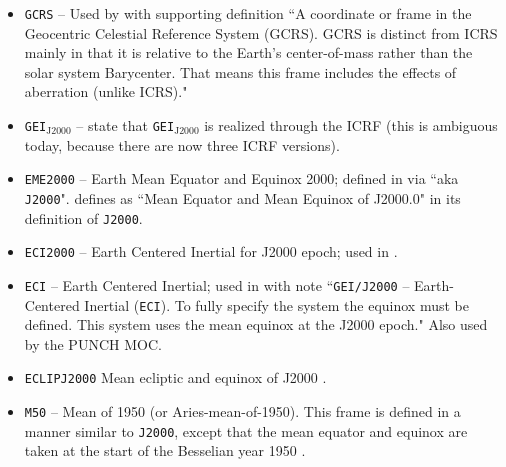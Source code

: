 \documentclass[draft]{agujournal2019}
\begin{document}
\begin{itemize}
    \item \texttt{GCRS} --  Used by  with supporting definition ``A coordinate or frame in the Geocentric Celestial Reference System (GCRS). GCRS is distinct from ICRS mainly in that it is relative to the Earth’s center-of-mass rather than the solar system Barycenter. That means this frame includes the effects of aberration (unlike ICRS)."

    \item \texttt{GEI}$_\mathrm{J2000}$ --  state that \texttt{GEI}$_\mathrm{J2000}$ is realized through the ICRF (this is ambiguous today, because there are now three ICRF versions).

    \item \texttt{EME2000} -- Earth Mean Equator and Equinox 2000; defined in  via ``aka \texttt{J2000}".  defines as ``Mean Equator and Mean Equinox of J2000.0" in its definition of \texttt{J2000}.

    \item \texttt{ECI2000} -- Earth Centered Inertial for J2000 epoch; used in \cite{Niehof2022}.

    \item \texttt{ECI} -- Earth Centered Inertial; used in  with note ``\texttt{GEI/J2000} – Earth-Centered Inertial (\texttt{ECI}). To fully specify the system the equinox must be defined. This system uses the mean equinox at the J2000 epoch." Also used by the PUNCH MOC.

    \item \texttt{ECLIPJ2000} Mean ecliptic and equinox of J2000 \cite{NAIFFrames2025}.


    \item \texttt{M50} -- Mean of 1950 (or Aries-mean-of-1950). This frame is defined in a manner similar to \texttt{J2000}, except that the mean equator and equinox are taken at the start of the Besselian year 1950 \cite{Davis1974}.
     


\end{itemize}
\end{document}
